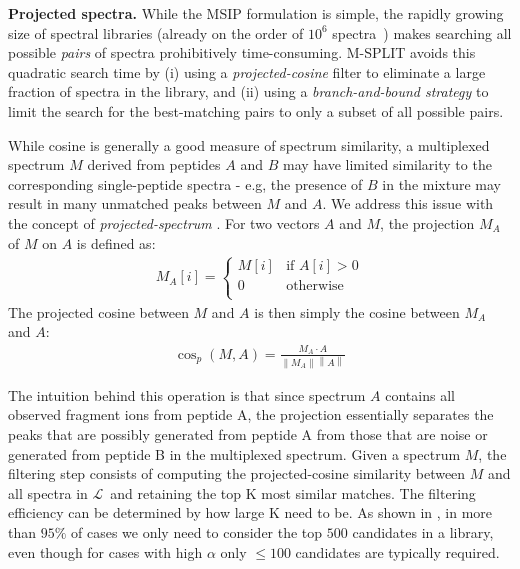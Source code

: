 \documentclass[arial,11pt]{article}
\newcommand{\speclib}{\ensuremath{\mathcal{L}}}
\begin{document}
{\bf Projected spectra.} While the MSIP formulation is simple, the rapidly growing size of spectral libraries (already on the order of $10^6$ spectra~\cite{NIST}) makes searching all possible {\em pairs} of spectra prohibitively time-consuming. M-SPLIT  avoids this quadratic search time by (i) using a {\em projected-cosine} filter to eliminate a large fraction of spectra in the library, and (ii) using a {\em branch-and-bound strategy} to limit the search for the best-matching pairs to only a subset of all possible pairs.

While cosine is generally a good measure of spectrum similarity, a multiplexed spectrum ${M}$ derived from peptides $A$ and $B$ may have limited similarity to the corresponding single-peptide spectra - e.g, the presence of ${B}$ in the mixture may result in many unmatched peaks between ${M}$ and ${A}$.  We address this issue with the concept of {\em projected-spectrum} \cite{wang2010msplit}. For two vectors $A$ and $M$, the projection $M_{A}$ of $M$ on $A$ is defined as:
\begin{eqnarray*}
	M_{A}[i] = \left\{ \begin{array}{ll}
                     M[i] & \mbox{if\ } A[i] > 0\\
                     0    & \mbox{otherwise}\\
                     \end{array}
                  \right.
\end{eqnarray*}
The projected cosine between $M$ and $A$ is then simply the cosine between	$M_{A}$ and $A$:
\begin{eqnarray*}
	\cos_{p}(M, A) = \frac{{	M_{A}}\cdot{A}}{\left\|{	 M_{A}}\right\|\left\|{A}\right\|}
\end{eqnarray*}

The intuition behind this operation is that since spectrum  $A$ contains all observed fragment ions from peptide A, the projection essentially separates the peaks that are possibly generated from peptide A from those that are noise or generated from peptide B in the multiplexed spectrum.
Given a spectrum $M$, the filtering step consists of computing the projected-cosine similarity between $M$ and all spectra in \speclib\ and retaining the top K most similar matches.  The filtering efficiency can be determined by how large K need to be.
As shown in \cite{wang2010msplit}, in more than $95\%$ of cases we only need to consider the top $500$ candidates in a library, even though for cases with high $\alpha$ only $\leq 100$ candidates are typically required.
\end{document}
